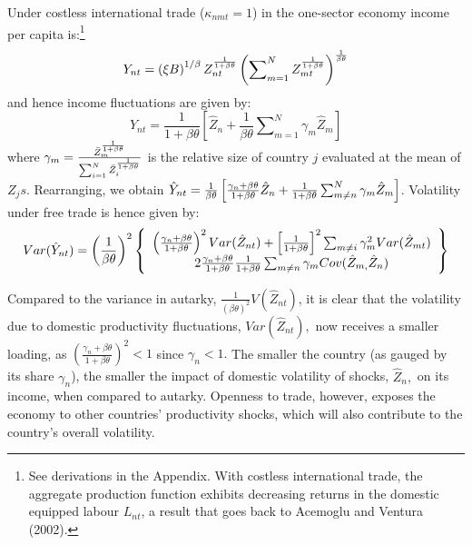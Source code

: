 \documentclass[12pt]{article}
\begin{document}
Under costless international trade ($\kappa _{nmt}=1$) in the one-sector
economy income per capita is:\footnote{%
See derivations in the Appendix. With costless international trade, the
aggregate production function exhibits decreasing returns in the domestic
equipped labour $L_{nt}$, a result that goes back to Acemoglu and Ventura
(2002).} 
\begin{equation*}
Y_{nt}=\left( \xi B\right) ^{1/\beta }Z_{nt}^{\frac{1}{1+\beta \theta }%
}\left( \sum\nolimits_{m=1}^{N}Z_{mt}^{\frac{1}{1+\beta \theta }}\right) ^{%
\frac{1}{\beta \theta }}
\end{equation*}%
and hence income fluctuations are given by: 
\begin{equation*}
\hat{Y}_{nt}=\frac{1}{1+\beta \theta }\left[ \hat{Z}_{n}+\frac{1}{\beta
\theta }\sum\nolimits_{m=1}^{N}\gamma _{m}\hat{Z}_{m}\right] 
\end{equation*}%
where $\gamma _{m}=\frac{\bar{Z}_{m}^{\frac{1}{1+\beta \theta }}}{%
\sum_{i=1}^{N}\bar{Z}_{i}^{\frac{1}{1+\beta \theta }}}$ is the relative size
of country $j$ evaluated at the mean of $Z_{j}s$. Rearranging, we obtain $%
\hat{Y}_{nt}=\frac{1}{\beta \theta }\left[ \frac{\gamma _{n}+\beta \theta }{%
1+\beta \theta }\hat{Z}_{n}+\frac{1}{1+\beta \theta }\sum_{m\neq
n}^{N}\gamma _{m}\hat{Z}_{m}\right] $. Volatility under free trade is hence
given by: 
\begin{equation*}
Var(\hat{Y}_{nt})=\left( \frac{1}{\beta \theta }\right) ^{2}\left\{ 
\begin{array}{c}
\left( \frac{\gamma _{n}+\beta \theta }{1+\beta \theta }\right) ^{2}Var(\hat{%
Z}_{nt})+\left[ \frac{1}{1+\beta \theta }\right] ^{2}\sum_{m\neq i}\gamma
_{m}^{2}Var(\hat{Z}_{mt}) \\ 
2\frac{\gamma _{n}+\beta \theta }{1+\beta \theta }\frac{1}{1+\beta \theta }%
\sum_{m\neq n}\gamma _{m}Cov(\hat{Z}_{m,}\hat{Z}_{n})%
\end{array}%
\right\} 
\end{equation*}

Compared to the variance in autarky, $\frac{1}{\left( \beta \theta \right)
^{2}}V(\hat{Z}_{nt})$, it is clear that the volatility due to domestic
productivity fluctuations, $Var(\hat{Z}_{nt}),$ now receives a smaller
loading, as $\left( \frac{\gamma _{n}+\beta \theta }{1+\beta \theta }\right)
^{2}<1$ since $\gamma _{n}<1.$ The smaller the country (as gauged by its
share $\gamma _{n}$), the smaller the impact of domestic volatility of
shocks, $\hat{Z}_{n},$ on its income, when compared to autarky. Openness to
trade, however, exposes the economy to other countries' productivity shocks,
which will also contribute to the country's overall volatility.
\end{document}
